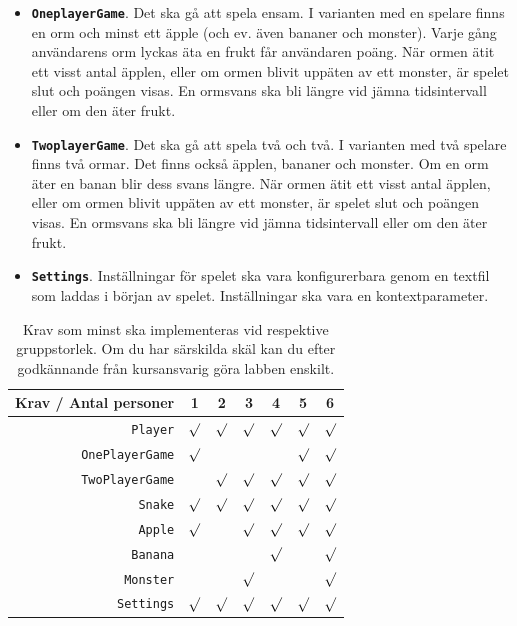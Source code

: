 \begin{itemize}[nosep, label={$\square$},]
\item \textbf{\texttt{OneplayerGame}}. Det ska gå att spela ensam. I varianten med en spelare finns en orm och minst ett äpple (och ev. även bananer och monster). Varje gång användarens orm lyckas äta en frukt får användaren poäng. När ormen ätit ett visst antal äpplen, eller om ormen blivit uppäten av ett monster, är spelet slut och poängen visas. En ormsvans ska bli längre vid jämna tidsintervall eller om den äter frukt.

\item \textbf{\texttt{TwoplayerGame}}. Det ska gå att spela två och två. I varianten med två spelare finns två ormar. Det finns också äpplen, bananer och monster. Om en orm äter en banan blir dess svans längre. När ormen ätit ett visst antal äpplen, eller om ormen blivit uppäten av ett monster, är spelet slut och poängen visas. En ormsvans ska bli längre vid jämna tidsintervall eller om den äter frukt.

\item \textbf{\texttt{Settings}}. Inställningar för spelet ska vara konfigurerbara genom en textfil som laddas i början av spelet. Inställningar ska vara en kontextparameter.  

\end{itemize}
\begin{table}[H]
  \centering
  \caption{Krav som minst ska implementeras vid respektive gruppstorlek. Om du har särskilda skäl kan du efter godkännande från kursansvarig göra labben enskilt.  \label{lab:snak:table-reqt}}

\begin{tabular}{r | c c c c c c}
  Krav / Antal personer & 1       & 2       & 3       & 4       & 5       & 6 \\ \hline
  \texttt{Player}       & $\surd$ & $\surd$ & $\surd$ & $\surd$ & $\surd$ & $\surd$ \\
  \texttt{OnePlayerGame}& $\surd$ &         &         &         & $\surd$ & $\surd$ \\
  \texttt{TwoPlayerGame}&         & $\surd$ & $\surd$ & $\surd$ & $\surd$ & $\surd$ \\
  \texttt{Snake}        & $\surd$ & $\surd$ & $\surd$ & $\surd$ & $\surd$ & $\surd$ \\
  \texttt{Apple}        & $\surd$ &         & $\surd$ & $\surd$ & $\surd$ & $\surd$ \\
  \texttt{Banana}       &         &         &         & $\surd$ &         & $\surd$ \\
  \texttt{Monster}      &         &         & $\surd$ &         &         & $\surd$ \\
  \texttt{Settings}     & $\surd$ & $\surd$ & $\surd$ & $\surd$ & $\surd$ & $\surd$ \\
\end{tabular}
\end{table}

